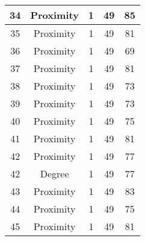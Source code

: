 \documentclass[results.tex]{subfiles}
\begin{document}
\begin{center}
\begin{tabular}{| c || c | c | c | c |}
            \hline
            34                      & Proximity                    & 1                      & 49                      & 85                   \\
            \hline
            35                      & Proximity                    & 1                      & 49                      & 81                   \\
            \hline
            36                      & Proximity                    & 1                      & 49                      & 69                   \\
            \hline
            37                      & Proximity                    & 1                      & 49                      & 81                   \\
            \hline
            38                      & Proximity                    & 1                      & 49                      & 73                   \\
            \hline
            39                      & Proximity                    & 1                      & 49                      & 73                   \\
            \hline
            40                      & Proximity                    & 1                      & 49                      & 75                   \\
            \hline
            41                      & Proximity                    & 1                      & 49                      & 81                   \\
            \hline
            42                      & Proximity                    & 1                      & 49                      & 77                   \\
            \hline
            42                      & Degree                       & 1                      & 49                      & 77                   \\
            \hline
            43                      & Proximity                    & 1                      & 49                      & 83                   \\
            \hline
            44                      & Proximity                    & 1                      & 49                      & 75                   \\
            \hline
            45                      & Proximity                    & 1                      & 49                      & 81                   \\

\end{tabular}
\end{center}
\end{document}

